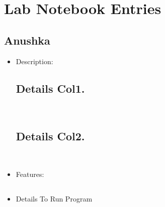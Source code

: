 \documentclass{article}
\begin{document}
\newpage
\section*{Lab Notebook Entries}
\subsection*{Anushka}
\begin{itemize}
    \subsection*{Program Name}


    \item Description: 
    
    \subsection*{Details Col1.}\\

    \subsection*{Details Col2.}\\

    \item Features: 
    \subsection*{}
    \subsection*{}
    \subsection*{}
    \subsection*{}

\item Details To Run Program 

\subsection*{}\\

\subsection*{}\\

\subsection*{}\\
\end{itemize}
\end{document}
